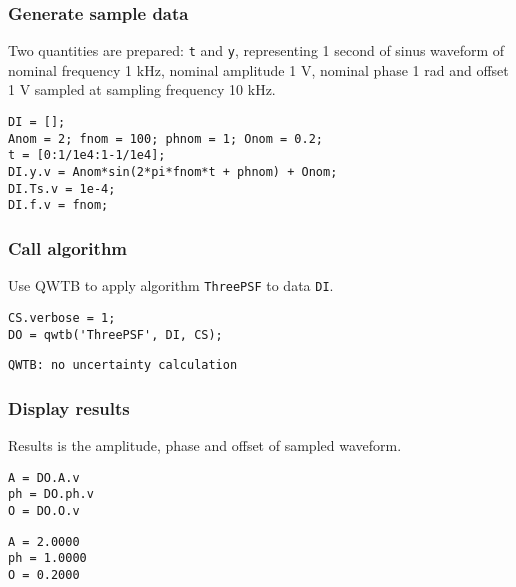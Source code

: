 \startcontents[localtoc]



{}
\subsubsection*{Generate sample data}



Two quantities are prepared: \texttt{t} and \texttt{y}, representing 1 second of sinus waveform of nominal
frequency 1 kHz, nominal amplitude 1 V, nominal phase 1 rad and offset 1 V sampled at sampling
frequency 10 kHz.

\begin{lstlisting}
DI = [];
Anom = 2; fnom = 100; phnom = 1; Onom = 0.2;
t = [0:1/1e4:1-1/1e4];
DI.y.v = Anom*sin(2*pi*fnom*t + phnom) + Onom;
DI.Ts.v = 1e-4;
DI.f.v = fnom;
\end{lstlisting}


{}
\subsubsection*{Call algorithm}



Use QWTB to apply algorithm \texttt{ThreePSF} to data \texttt{DI}.

\begin{lstlisting}
CS.verbose = 1;
DO = qwtb('ThreePSF', DI, CS);
\end{lstlisting}
\begin{lstlisting}[language={},xleftmargin=5pt,frame=none]
QWTB: no uncertainty calculation

\end{lstlisting}


{}
\subsubsection*{Display results}



Results is the amplitude, phase and offset of sampled waveform.

\begin{lstlisting}
A = DO.A.v
ph = DO.ph.v
O = DO.O.v
\end{lstlisting}
\begin{lstlisting}[language={},xleftmargin=5pt,frame=none]
A = 2.0000
ph = 1.0000
O = 0.2000

\end{lstlisting}


